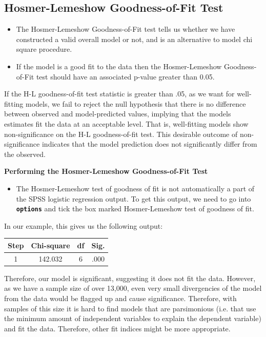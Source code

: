\documentclass[a4paper,12pt]{article}
\begin{document}
\subsection{Hosmer-Lemeshow Goodness-of-Fit Test}
\begin{framed}
	\begin{itemize}
		\item The Hosmer-Lemeshow Goodness-of-Fit
		test tells us whether we have constructed a valid overall model or not, and is an alternative to model chi square procedure.
		\item If the model is a good fit to the data then the Hosmer-Lemeshow Goodness-of-Fit test should have an associated p-value greater than 0.05.
	\end{itemize} 
\end{framed}
If the H-L goodness-of-fit test statistic is greater than .05, as we want for well-fitting models, we fail to reject the null hypothesis that there is no difference between observed and model-predicted values, implying that the models estimates fit the data at an acceptable level. That is, well-fitting models show non-significance on the
H-L goodness-of-fit test. This desirable outcome of non-significance indicates that the
model prediction does not significantly differ from the observed.

\noindent \textbf{Performing the Hosmer-Lemeshow Goodness-of-Fit Test} 	
\begin{itemize}	
	\item 	
	The Hosmer-Lemeshow test of goodness of fit is not automatically a part of the SPSS logistic regression output. 
	To get this output, we need to go into \textbf{\texttt{options}} and tick the box marked Hosmer-Lemeshow test of goodness of fit. 
\end{itemize}



In our example, this gives us the following output:

\begin{center}
	\begin{tabular}{|c|c|c|c|}
		\hline  Step	& Chi-square&	df 	 & Sig. \\ \hline
		1	 & 142.032	& 6	 &.000 \\ 
		\hline 
	\end{tabular} 
\end{center}


Therefore, our model is significant, suggesting it does not fit the data. However, as we have a sample size of over 13,000, even very small divergencies of the model from the data would be flagged up and cause significance. Therefore, with samples of this size it is hard to find models that are parsimonious (i.e. that use the minimum amount of independent variables to explain the dependent variable) and fit the data. Therefore, other fit indices might be more appropriate.\\
\end{document}
